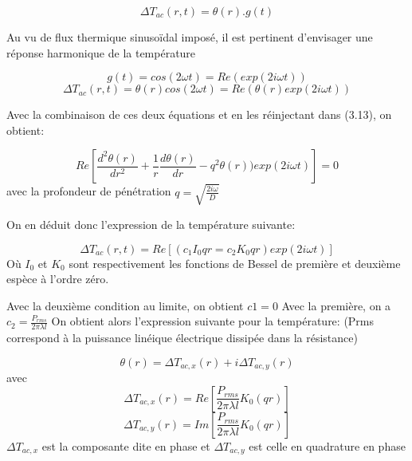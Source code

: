 \documentclass[10pt,a4paper]{report}
\begin{document}
\begin{center}
\begin{equation}
\Delta T_{ac}(r,t)=\theta(r).g(t)
\end{equation}
\end{center}
Au vu de flux thermique sinusoïdal imposé, il est pertinent d’envisager une réponse harmonique de la température
\begin{center}
\begin{equation}
g(t)=cos(2\omega t)=Re(exp(2i\omega t))
\end{equation}
\begin{equation}
\Delta T_{ac}(r,t)=\theta(r)cos(2\omega t)=Re(\theta(r)exp(2i\omega t))
\end{equation}
\end{center}
Avec la combinaison de ces deux équations et en les réinjectant dans (3.13), on obtient:
\begin{center}
\begin{equation}
Re[\frac{d^2\theta(r)}{dr^2}+\frac{1}{r}\frac{d\theta(r)}{dr}-q^2\theta(r))exp(2i\omega t)]=0
\end{equation}
avec la profondeur de pénétration $q=\sqrt{\frac{2i\omega}{D}}$
\end{center}
On en déduit donc l’expression de la température suivante:
\begin{center}
\begin{equation}
\Delta T_{ac}(r,t)=Re[(c_{1}I_{0}qr=c_{2}K_{0}qr)exp(2i\omega t)]
\end{equation}
Où $I_{0}$ et $K_{0}$ sont respectivement les fonctions de Bessel de première et deuxième espèce à l’ordre zéro.
\end{center}
Avec la deuxième condition au limite, on obtient $c1=0$
\newline
\newline
Avec la première, on a $c_{2}=\frac{P_{rms}}{2\pi\lambda l}$
\newline
On obtient alors l’expression suivante pour la température: (Prms correspond à la puissance linéique électrique dissipée dans la résistance) 
\begin{center}
\begin{equation}
\theta(r)=\Delta T_{ac,x}(r)+i\Delta T_{ac,y}(r)
\end{equation}
avec 
\begin{equation}
\Delta T_{ac,x}(r)=Re[\frac{P_{rms}}{2\pi\lambda l}K_{0}(qr)]
\end{equation}
\begin{equation}
\Delta T_{ac,y}(r)=Im[\frac{P_{rms}}{2\pi\lambda l}K_{0}(qr)]
\end{equation}
\newline
$\Delta T_{ac,x}$ est la composante dite en phase et $\Delta T_{ac,y}$ est celle en quadrature en phase
\end{center}
\end{document}
